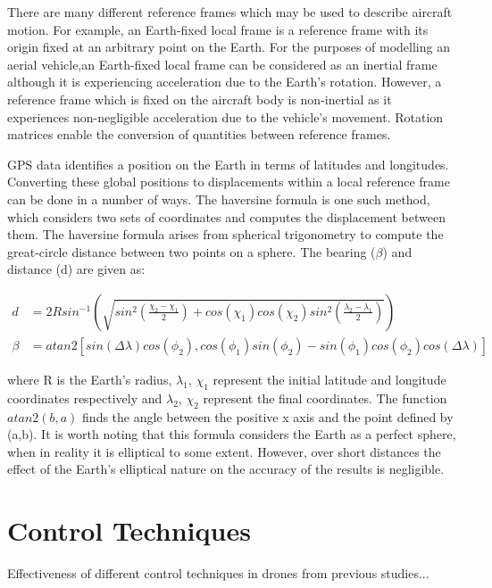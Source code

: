 There are many different reference frames which may be used to describe aircraft motion. For example, an Earth-fixed local frame is a reference frame with its origin fixed at an arbitrary point on the Earth. For the purposes of modelling an aerial vehicle,an Earth-fixed local frame can be considered as an inertial frame although it is experiencing acceleration due to the Earth's rotation. However, a reference frame which is fixed on the aircraft body is non-inertial as it experiences non-negligible acceleration due to the vehicle's movement. Rotation matrices enable the conversion of quantities between reference frames.

GPS data identifies a position on the Earth in terms of latitudes and longitudes. Converting these global positions to displacements within a local reference frame can be done in a number of ways. The haversine formula is one such method, which considers two sets of coordinates and computes the displacement between them. The haversine formula arises from spherical trigonometry to compute the great-circle distance between two points on a sphere. The bearing ($\beta$) and distance (d) are given as:

\begin{equation}\label{eqn:haversine}
\begin{split}
d&=2R sin^{-1} \left( \sqrt{sin^{2}\left( \frac{\chi_{2}-\chi_{1}}{2} \right) +cos(\chi_{1})cos(\chi_{2})sin^{2} \left( \frac{\lambda_{2}-\lambda_{1}}{2}  \right) }\right)\\
\beta&=atan2\left[ sin(\Delta\lambda)cos(\phi_{2}) , cos(\phi_{1})sin(\phi_{2}) - sin(\phi_{1}) cos(\phi_2) cos(\Delta\lambda)\right]
\end{split}
\end{equation}

where R is the Earth's radius, $\lambda_{1}$, $\chi_{1}$ represent the initial latitude and longitude coordinates respectively and $\lambda_{2}$, $\chi_{2}$ represent the final coordinates. The function $atan2(b,a)$ finds the angle between the positive x axis and the point defined by (a,b).
It is worth noting that this formula considers the Earth as a perfect sphere, when in reality it is elliptical to some extent. However, over short distances the effect of the Earth's elliptical nature on the accuracy of the results is negligible.


\section{Control Techniques}
Effectiveness of different control techniques in drones from previous studies...

